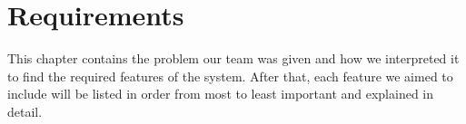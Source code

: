 \chapter{Requirements}
\label{requirements}

This chapter contains the problem our team was given and how we interpreted it to find the required features of the system. After that, each feature we aimed to include will be listed in order from most to least important and explained in detail.




